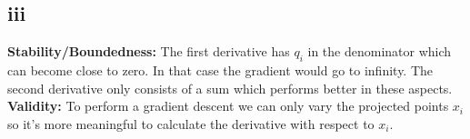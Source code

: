 \subsection*{iii}
\textbf{Stability/Boundedness:} The first derivative has $q_i$ in the denominator which can become close to zero.
In that case the gradient would go to infinity.
The second derivative only consists of a sum which performs better in these aspects. \\
\textbf{Validity:} To perform a gradient descent we can only vary the projected points $x_i$ so it's more meaningful to calculate the derivative with respect to $x_i$.


\clearpage
